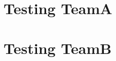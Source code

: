 \documentclass[12pt]{article}
\begin{document}


\newpage
\tableofcontents

\pagebreak

\section{Testing TeamA}


\section{Testing TeamB}

\end{document}
